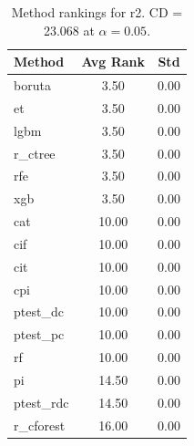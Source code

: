 \begin{table}[h]
\centering
\caption{Method rankings for r2. CD = 23.068 at $\alpha=0.05$.}
\label{tab:ranks_r2}
\begin{tabular}{lcc}
\toprule
Method & Avg Rank & Std \\
\midrule
boruta & 3.50 & 0.00 \\
et & 3.50 & 0.00 \\
lgbm & 3.50 & 0.00 \\
r_ctree & 3.50 & 0.00 \\
rfe & 3.50 & 0.00 \\
xgb & 3.50 & 0.00 \\
cat & 10.00 & 0.00 \\
cif & 10.00 & 0.00 \\
cit & 10.00 & 0.00 \\
cpi & 10.00 & 0.00 \\
ptest_dc & 10.00 & 0.00 \\
ptest_pc & 10.00 & 0.00 \\
rf & 10.00 & 0.00 \\
pi & 14.50 & 0.00 \\
ptest_rdc & 14.50 & 0.00 \\
r_cforest & 16.00 & 0.00 \\
\bottomrule
\end{tabular}
\end{table}